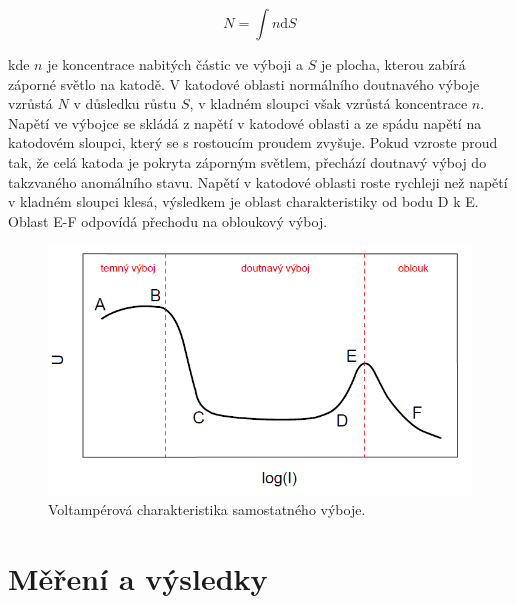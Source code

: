 \documentclass[a4paper,12pt]{article}
\begin{document}
\begin{equation}
	N = \int n \text{d}S
	\label{10}
\end{equation}

kde $n$ je koncentrace nabitých částic ve výboji a $S$ je plocha, kterou zabírá záporné světlo na katodě. V katodové oblasti normálního doutnavého výboje vzrůstá $N$ v důsledku růstu $S$, v kladném sloupci však vzrůstá koncentrace $n$. Napětí ve výbojce se skládá z napětí v katodové oblasti a ze spádu napětí na katodovém sloupci, který se s rostoucím proudem zvyšuje. Pokud vzroste proud tak, že celá katoda je pokryta záporným světlem, přechází doutnavý výboj do takzvaného anomálního stavu. Napětí v katodové oblasti roste rychleji než napětí v kladném sloupci klesá, výsledkem je oblast charakteristiky od bodu D k E. Oblast E-F odpovídá přechodu na obloukový výboj.


\begin{figure}[h]
	\centering
	\includegraphics[width=130mm]{VA.png}
	\caption{Voltampérová charakteristika samostatného výboje.}
	\label{VA}
\end{figure}




\section{Měření a výsledky}
\end{document}
